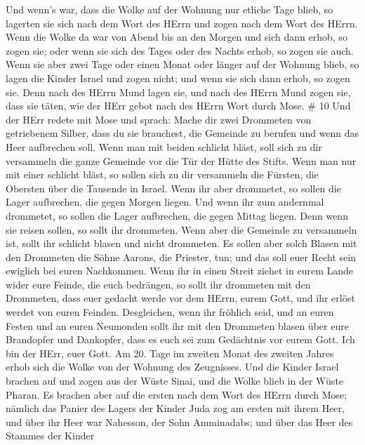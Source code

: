  Und wenn's war, dass die Wolke auf der Wohnung nur etliche
Tage blieb, so lagerten sie sich nach dem Wort des HErrn und zogen nach
dem Wort des HErrn.  Wenn die Wolke da war von Abend bis an
den Morgen und sich dann erhob, so zogen sie; oder wenn sie sich des
Tages oder des Nachts erhob, so zogen sie auch.  Wenn sie
aber zwei Tage oder einen Monat oder länger auf der Wohnung blieb, so
lagen die Kinder Israel und zogen nicht; und wenn sie sich dann erhob,
so zogen sie.  Denn nach des HErrn Mund lagen sie, und nach
des HErrn Mund zogen sie, dass sie täten, wie der HErr gebot nach des
HErrn Wort durch Mose. \# 10  Und der HErr redete mit Mose
und sprach:  Mache dir zwei Drommeten von getriebenem
Silber, dass du sie brauchest, die Gemeinde zu berufen und wenn das Heer
aufbrechen soll.  Wenn man mit beiden schlicht bläst, soll
sich zu dir versammeln die ganze Gemeinde vor die Tür der Hütte des
Stifts.  Wenn man nur mit einer schlicht bläst, so sollen
sich zu dir versammeln die Fürsten, die Obersten über die Tausende in
Israel.  Wenn ihr aber drommetet, so sollen die Lager
aufbrechen, die gegen Morgen liegen.  Und wenn ihr zum
andernmal drommetet, so sollen die Lager aufbrechen, die gegen Mittag
liegen. Denn wenn sie reisen sollen, so sollt ihr drommeten.
 Wenn aber die Gemeinde zu versammeln ist, sollt ihr
schlicht blasen und nicht drommeten.  Es sollen aber solch
Blasen mit den Drommeten die Söhne Aarons, die Priester, tun; und das
soll euer Recht sein ewiglich bei euren Nachkommen.  Wenn
ihr in einen Streit ziehet in eurem Lande wider eure Feinde, die euch
bedrängen, so sollt ihr drommeten mit den Drommeten, dass euer gedacht
werde vor dem HErrn, eurem Gott, und ihr erlöst werdet von euren
Feinden.  Desgleichen, wenn ihr fröhlich seid, und an euren
Festen und an euren Neumonden sollt ihr mit den Drommeten blasen über
eure Brandopfer und Dankopfer, dass es euch sei zum Gedächtnis vor eurem
Gott. Ich bin der HErr, euer Gott.  Am 20. Tage im zweiten
Monat des zweiten Jahres erhob sich die Wolke von der Wohnung des
Zeugnisses.  Und die Kinder Israel brachen auf und zogen
aus der Wüste Sinai, und die Wolke blieb in der Wüste Pharan.
 Es brachen aber auf die ersten nach dem Wort des HErrn
durch Mose;  nämlich das Panier des Lagers der Kinder Juda
zog am ersten mit ihrem Heer, und über ihr Heer war Nahesson, der Sohn
Amminadabs;  und über das Heer des Stammes der Kinder
